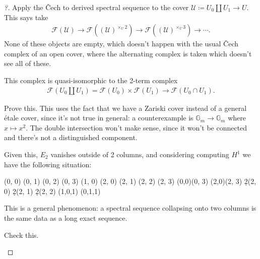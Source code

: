 \begin{proof}[?]

Apply the Čech to derived spectral sequence to the cover
\(\mathcal{U} \coloneqq U_0 {\coprod}U_1 \to U\). This says take
\begin{align*}  
\mathcal{F}(\mathcal{U}) \to 
\mathcal{F}((\mathcal{U})^{\times_U 2} ) \to
\mathcal{F}((\mathcal{U})^{\times_U 3} ) \to
\cdots
.\end{align*}
None of these objects are empty, which doesn't happen with the usual
Čech complex of an open cover, where the alternating complex is taken
which doesn't see all of these.

\begin{claim}

This complex is quasi-isomorphic to the 2-term complex
\begin{align*}  
\mathcal{F}(U_0 {\coprod}U_1) = \mathcal{F}(U_0) \times\mathcal{F}(U_1) \to
\mathcal{F}(U_0 \cap U_1)
.\end{align*}

\end{claim}

\begin{exercise}[?]

Prove this. This uses the fact that we have a Zariski cover instead of a
general étale cover, since it's not true in general: a counterexample is
\({\mathbb{G}}_m \to {\mathbb{G}}_m\) where \(x\mapsto x^2\). The double
intersection won't make sense, since it won't be connected and there's
not a distinguished component.

\end{exercise}

Given this, \(E_2\) vanishes outside of 2 columns, and considering
computing \(H^1\) we have the following situation:

\begin{sseqdata}[ name = "2col", xscale=0.6, homological Serre grading, y range = {0}{2}, differentials = blue]
\class(0, 0)
\class(0, 1)
\class(0, 2)
\class(0, 3)
\class(1, 0)
\class(2, 0)
\class(2, 1)
\class(2, 2)
\class(2, 3)
\structline(0,0)(0, 3)
\structline(2,0)(2, 3)
\d2(2, 0)
\d2(2, 1)
\d2(2, 2)
\classoptions[red](1,0,1)
\classoptions[red](0,1,1)
\end{sseqdata}
\begin{center}
\printpage[ name = "2col", page = 2]
\end{center}

This is a general phenomenon: a spectral sequence collapsing onto two
columns is the same data as a long exact sequence.

\begin{exercise}[?]

Check this.

\end{exercise}

\end{proof}

